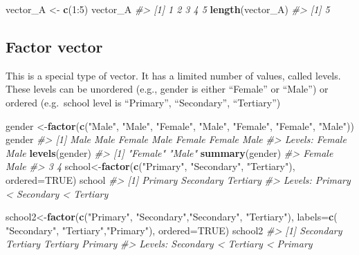 \documentclass[]{book}
\newenvironment{Shaded}{}{}
\newcommand{\CommentTok}[1]{\textcolor[rgb]{0.38,0.63,0.69}{\textit{#1}}}
\newcommand{\DataTypeTok}[1]{\textcolor[rgb]{0.56,0.13,0.00}{#1}}
\newcommand{\DecValTok}[1]{\textcolor[rgb]{0.25,0.63,0.44}{#1}}
\newcommand{\KeywordTok}[1]{\textcolor[rgb]{0.00,0.44,0.13}{\textbf{#1}}}
\newcommand{\NormalTok}[1]{#1}
\newcommand{\OperatorTok}[1]{\textcolor[rgb]{0.40,0.40,0.40}{#1}}
\newcommand{\OtherTok}[1]{\textcolor[rgb]{0.00,0.44,0.13}{#1}}
\newcommand{\StringTok}[1]{\textcolor[rgb]{0.25,0.44,0.63}{#1}}
\theoremstyle{definition}
\theoremstyle{definition}
\theoremstyle{definition}
\theoremstyle{remark}
\begin{document}
\begin{Shaded}
\begin{Highlighting}[]
\NormalTok{vector_A <-}\StringTok{ }\KeywordTok{c}\NormalTok{(}\DecValTok{1}\OperatorTok{:}\DecValTok{5}\NormalTok{)}
\NormalTok{vector_A}
\CommentTok{#> [1] 1 2 3 4 5}
\KeywordTok{length}\NormalTok{(vector_A)}
\CommentTok{#> [1] 5}
\end{Highlighting}
\end{Shaded}

\hypertarget{factor-vector}{%
\subsection{Factor vector}\label{factor-vector}}

This is a special type of vector. It has a limited number of values,
called levels. These levels can be unordered (e.g., gender is either
``Female'' or ``Male'') or ordered (e.g.~school level is ``Primary'',
``Secondary'', ``Tertiary'')

\begin{Shaded}
\begin{Highlighting}[]
\NormalTok{gender <-}\KeywordTok{factor}\NormalTok{(}\KeywordTok{c}\NormalTok{(}\StringTok{"Male"}\NormalTok{, }\StringTok{"Male"}\NormalTok{, }\StringTok{"Female"}\NormalTok{, }\StringTok{"Male"}\NormalTok{, }\StringTok{"Female"}\NormalTok{, }\StringTok{"Female"}\NormalTok{, }\StringTok{"Male"}\NormalTok{))}
\NormalTok{gender}
\CommentTok{#> [1] Male   Male   Female Male   Female Female Male  }
\CommentTok{#> Levels: Female Male}
\KeywordTok{levels}\NormalTok{(gender)}
\CommentTok{#> [1] "Female" "Male"}
\KeywordTok{summary}\NormalTok{(gender)}
\CommentTok{#> Female   Male }
\CommentTok{#>      3      4}
\NormalTok{school<-}\KeywordTok{factor}\NormalTok{(}\KeywordTok{c}\NormalTok{(}\StringTok{"Primary"}\NormalTok{, }\StringTok{"Secondary"}\NormalTok{, }\StringTok{"Tertiary"}\NormalTok{), }\DataTypeTok{ordered=}\OtherTok{TRUE}\NormalTok{)}
\NormalTok{school}
\CommentTok{#> [1] Primary   Secondary Tertiary }
\CommentTok{#> Levels: Primary < Secondary < Tertiary}

\NormalTok{school2<-}\KeywordTok{factor}\NormalTok{(}\KeywordTok{c}\NormalTok{(}\StringTok{"Primary"}\NormalTok{, }\StringTok{"Secondary"}\NormalTok{,}\StringTok{"Secondary"}\NormalTok{, }\StringTok{"Tertiary"}\NormalTok{), }\DataTypeTok{labels=}\KeywordTok{c}\NormalTok{( }\StringTok{"Secondary"}\NormalTok{, }\StringTok{"Tertiary"}\NormalTok{,}\StringTok{"Primary"}\NormalTok{), }\DataTypeTok{ordered=}\OtherTok{TRUE}\NormalTok{)}
\NormalTok{school2}
\CommentTok{#> [1] Secondary Tertiary  Tertiary  Primary  }
\CommentTok{#> Levels: Secondary < Tertiary < Primary}
\end{Highlighting}
\end{Shaded}
\end{document}
